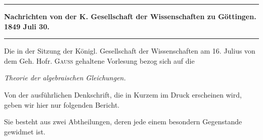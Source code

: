 \clearpage
{}
\par\noindent\hfill\rule{0.30\linewidth}{0.4pt}\hfill\mbox{}\par
\begin{center}
\textbf{Nachrichten von der K. Gesellschaft der Wissenschaften zu Göttingen. 1849 Juli 30.}
\end{center}

\par\noindent\hfill\rule{0.30\linewidth}{0.4pt}\hfill\mbox{}\par

 Die in der Sitzung der Königl. Gesellschaft der Wissenschaften am 16. Julius von dem Geh. Hofr. \textsc{Gauss} gehaltene Vorlesung bezog sich auf die
\begin{center}
\textit{Theorie der algebraischen Gleichungen.}
\end{center}
 Von der ausführlichen Denkschrift, die in Kurzem im Druck erscheinen wird, geben wir hier nur folgenden Bericht.

Sie besteht aus zwei Abtheilungen, deren jede einem besondern Gegenstande gewidmet ist.

